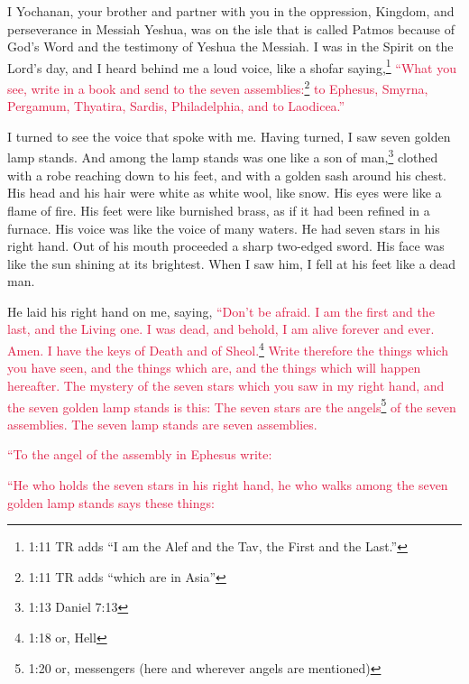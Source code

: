\myverse{}I Yochanan, your brother and partner with you in the oppression,
Kingdom, and perseverance in Messiah Yeshua, was on the isle that is called Patmos because of God’s Word
and the testimony of Yeshua the Messiah.
\myverse{}I was in the Spirit on the Lord’s day, and I heard behind me a loud voice,
like a shofar
\myverse{}saying,\footnote{1:11 TR adds “I am the Alef and the Tav, the First and the Last.”}
\textcolor{crimson}{“What you see, write in a book and send to the seven assemblies:}\footnote{1:11 TR adds “which are in Asia”}
\textcolor{crimson}{to Ephesus, Smyrna, Pergamum, Thyatira, Sardis, Philadelphia, and to Laodicea.”}

\myverse{}I turned to see the voice that spoke with me. Having turned,
I saw seven golden lamp stands.
\myverse{}And among the lamp stands was one like a son of man,\footnote{1:13 Daniel 7:13
} clothed with a robe reaching down to his feet, and with a golden sash around his chest.
\myverse{}His head and his hair were white as white wool, like snow. His eyes were like
a flame of fire.
\myverse{}His feet were like burnished brass, as if it had been refined in a furnace.
His voice was like the voice of many waters.
\myverse{}He had seven stars in his right hand. Out of his mouth proceeded a sharp two-edged
sword. His face was like the sun shining at its brightest.
\myverse{}When I saw him, I fell at his feet like a dead man.

He laid his right hand on me, saying, \textcolor{crimson}{“Don’t be afraid. I am the first and the last,} \myverse{}\textcolor{crimson}{and the Living one. I was dead, and behold, I am alive forever and ever. Amen. I have the keys of Death and of Sheol.}\footnote{1:18 or, Hell} \myverse{}\textcolor{crimson}{Write therefore the things which you have seen, and the things which are, and the things which will happen hereafter.} \myverse{}\textcolor{crimson}{The mystery of the seven stars which you saw in my right hand, and the seven golden lamp stands is this: The seven stars are the angels}\footnote{1:20 or, messengers (here and wherever angels are mentioned)} \textcolor{crimson}{of the seven assemblies. The seven lamp stands are seven assemblies.}



\mychapter{} \myverse*{}\textcolor{crimson}{“To the angel of the assembly in Ephesus write:}

\textcolor{crimson}{“He who holds the seven stars in his right hand, he who walks among the seven golden
	lamp stands says these things:}

